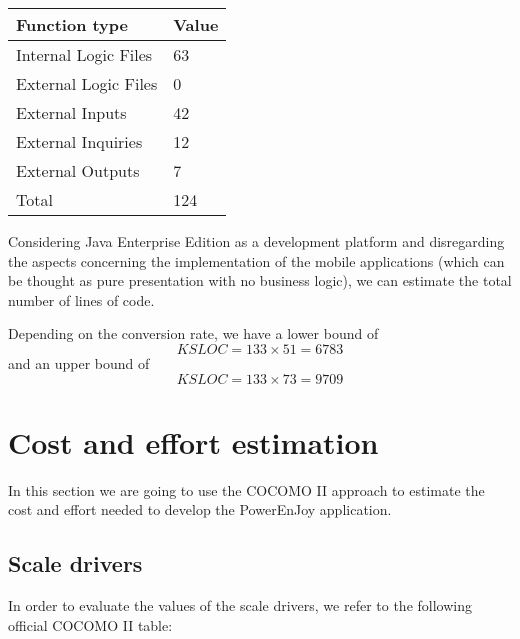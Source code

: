 \begin{table}[H]
	\centering
	\begin{tabular}{|l|l|}
		\hline
		Function type & Value \\
		\hline
		Internal Logic Files & 63 \\
		External Logic Files & 0 \\
		External Inputs & 42 \\
		External Inquiries & 12 \\
		External Outputs & 7 \\
		\hline
		Total & 124 \\
		\hline
	\end{tabular}
\end{table}
Considering Java Enterprise Edition as a development platform and disregarding the aspects concerning the implementation of the mobile applications (which can be thought as pure presentation with no business logic), we can estimate the total number of lines of code.

Depending on the conversion rate, we have a lower bound of \[KSLOC = 133 \times 51 = 6783\] and an upper bound of \[KSLOC = 133 \times 73 = 9709\]

\section{Cost and effort estimation}
In this section we are going to use the COCOMO II approach to estimate the
cost and effort needed to develop the PowerEnJoy application.

\subsection{Scale drivers}
In order to evaluate the values of the scale drivers, we refer to the following official COCOMO II table:

